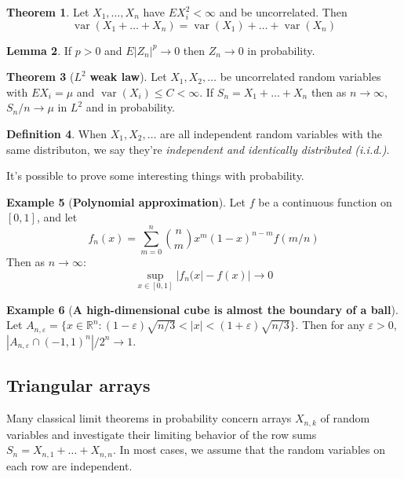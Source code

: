 \documentclass{article}
\theoremstyle{definition}
\newtheorem{theorem}{Theorem}[section]
\newtheorem{lemma}[theorem]{Lemma}
\newtheorem{definition}[theorem]{Definition}
\newtheorem{example}[theorem]{Example}
\begin{document}
\begin{theorem}
    Let $X_1, \dots, X_n$ have $EX_i^2 < \infty$ and be uncorrelated. Then
    $$ \operatorname{var}(X_1 + \dots + X_n) = \operatorname{var}(X_1) + \dots + \operatorname{var}(X_n)$$
\end{theorem}

\begin{lemma}
    If $p > 0$ and $E|Z_n|^p \to 0$ then $Z_n \to 0$ in probability.
\end{lemma}

\begin{theorem}[$L^2$ \textbf{weak law}]
    Let $X_1, X_2, \dots$ be uncorrelated random variables with $EX_i = \mu$ and $\operatorname{var}(X_i) \leq C < \infty$. If $S_n = X_1 + \dots + X_n$ then as $n \to \infty$, $S_n/n \to \mu$ in $L^2$ and in probability.
\end{theorem}

\begin{definition}
    When $X_1, X_2, \dots$ are all independent random variables with the same distributon, we say they're \emph{independent and identically distributed (i.i.d.)}.
\end{definition}

It's possible to prove some interesting things with probability.

\begin{example}[\textbf{Polynomial approximation}]
    Let $f$ be a continuous function on $[0, 1]$, and let
    $$ f_n(x) = \sum\limits_{m=0}^n \binom{n}{m} x^m (1 - x)^{n-m} f(m/n)$$
    Then as $n \to \infty$:
    $$ \sup_{x \in [0, 1]} |f_n(x| - f(x)| \to 0$$
\end{example}

\begin{example}[\textbf{A high-dimensional cube is almost the boundary of a ball}]
    Let $A_{n, \varepsilon} = \{x \in \mathbb{R}^n : (1 - \varepsilon) \sqrt{n/3} < |x| < (1 + \varepsilon) \sqrt{n/3} \}$. Then for any $\varepsilon > 0$, $|A_{n, \varepsilon} \cap (-1, 1)^n| / 2^n \to 1$.
\end{example}

\subsection{Triangular arrays}

Many classical limit theorems in probability concern arrays $X_{n, k}$ of random variables and investigate their limiting behavior of the row sums $S_n = X_{n, 1} + \dots + X_{n, n}$. In most cases, we assume that the random variables on each row are independent.
\end{document}
